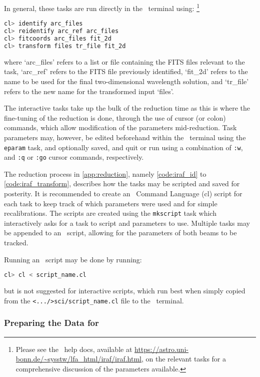{\noindent In} general, these tasks are run directly in the \iraf\ terminal using:%
\footnote{Please see the \iraf\ help docs, available at \url{https://astro.uni-bonn.de/~sysstw/lfa_html/iraf/iraf.html}, on the relevant tasks for a comprehensive discussion of the parameters available.}

\begin{lstlisting}[language=bash]
cl> identify arc_files
cl> reidentify arc_ref arc_files
cl> fitcoords arc_files fit_2d
cl> transform files tr_file fit_2d
\end{lstlisting}
{\parskip=0pt where} `arc\_files' refers to a list or file containing the \gls{FITS} files relevant to the task, `arc\_ref' refers to the \gls{FITS} file previously identified, `fit\_2d' refers to the name to be used for the final two-dimensional wavelength solution, and `tr\_file' refers to the new name for the transformed input `files'.

The interactive tasks take up the bulk of the reduction time as this is where the fine-tuning of the reduction is done, through the use of cursor (or colon) commands, which allow modification of the parameters mid-reduction. Task parameters may, however, be edited beforehand within the \iraf\ terminal using the \texttt{eparam} task, and optionally saved, and quit or run using a combination of \texttt{:w}, and \texttt{:q} or \texttt{:go} cursor commands, respectively.

The reduction process in \autoref{app:reduction}, namely \autoref{code:iraf_id} to \ref{code:iraf_transform}, describes how the tasks may be scripted and saved for posterity. It is recommended to create an \iraf\ Command Language (cl) script for each task to keep track of which parameters were used and for simple recalibrations. The scripts are created using the \texttt{mkscript} task which interactively asks for a task to script and parameters to use. Multiple tasks may be appended to an \iraf\ script, allowing for the parameters of both beams to be tracked.

Running an \iraf\ script may be done by running:
\begin{lstlisting}[language=bash]
cl> cl < script_name.cl
\end{lstlisting}
{\parskip=0pt but} is not suggested for interactive scripts, which run best when simply copied from the \texttt{<.../>sci/script\_name.cl} file to the \iraf\ terminal.

\pagebreak

\subsubsection{Preparing the Data for \polsalt}

